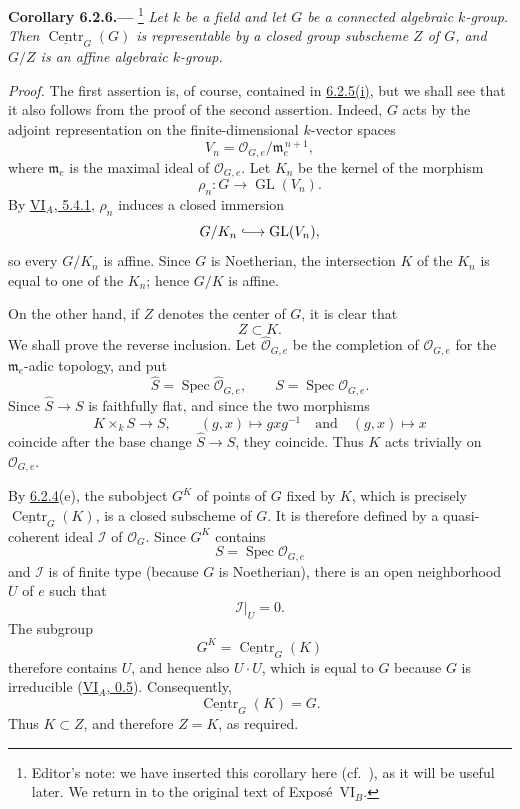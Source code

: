 
\medskip
{}\label{cor:sga3-VIB-6.2.6}%
\noindent\textbf{Corollary 6.2.6.---}%
\footnote{\label{note:sga3-VIB-59}Editor's note: we have inserted
this corollary here (cf.\ ), as it will be useful
later. We return in  to the original text of
Expos\'e~VI\(_B\).}
\emph{Let \(k\) be a field and let \(G\) be a connected
algebraic \(k\)-group. Then
\(\underline{\operatorname{Centr}}_G(G)\) is representable by a
closed group subscheme \(Z\) of \(G\), and \(G/Z\) is an affine
algebraic \(k\)-group.}

\emph{Proof.}
The first assertion is, of course, contained in
\hyperref[cor:sga3-VIB-6.2.5]{6.2.5\textup{(i)}}, but we shall
see that it also follows from the proof of the second assertion.
Indeed, \(G\) acts by the adjoint representation on the
finite-dimensional \(k\)-vector spaces
\[
  V_n=\mathcal O_{G,e}/\mathfrak m_e^{\,n+1},
\]
where \(\mathfrak m_e\) is the maximal ideal of
\(\mathcal O_{G,e}\). Let \(K_n\) be the kernel of the morphism
\[
  \rho_n:G\longrightarrow\operatorname{GL}(V_n).
\]
By \hyperref[prop:sga3-VIA-5.4.1]{VI\(_A\), 5.4.1},
\(\rho_n\) induces a closed immersion
\[
  G/K_n\lhook\joinrel\longrightarrow\operatorname{GL}(V_n),
\]
so every \(G/K_n\) is affine. Since \(G\) is Noetherian, the
intersection \(K\) of the \(K_n\) is equal to one of the \(K_n\);
hence \(G/K\) is affine.

On the other hand, if \(Z\) denotes the center of \(G\), it is
clear that
\[
  Z\subset K.
\]
We shall prove the reverse inclusion. Let
\(\widehat{\mathcal O}_{G,e}\) be the completion of
\(\mathcal O_{G,e}\) for the \(\mathfrak m_e\)-adic topology,
and put
\[
  \widehat S=\operatorname{Spec}\widehat{\mathcal O}_{G,e},
  \qquad
  S=\operatorname{Spec}\mathcal O_{G,e}.
\]
Since \(\widehat S\to S\) is faithfully flat, and since the two
morphisms
\[
  K\times_k S\longrightarrow S,
  \qquad
  (g,x)\longmapsto gxg^{-1}
  \quad\text{and}\quad
  (g,x)\longmapsto x
\]
coincide after the base change \(\widehat S\to S\), they
coincide. Thus \(K\) acts trivially on \(\mathcal O_{G,e}\).

By \hyperref[ex:sga3-VIB-6.2.4-e]{6.2.4}\textup{(e)}, the subobject \(G^K\) of points of \(G\)
fixed by \(K\), which is precisely
\(\underline{\operatorname{Centr}}_G(K)\), is a closed
subscheme of \(G\). It is therefore defined by a quasi-coherent
ideal \(\mathcal I\) of \(\mathcal O_G\). Since \(G^K\) contains
\[
  S=\operatorname{Spec}\mathcal O_{G,e}
\]
and \(\mathcal I\) is of finite type (because \(G\) is
Noetherian), there is an open neighborhood \(U\) of \(e\) such
that
\[
  \mathcal I|_U=0.
\]
The subgroup
\[
  G^K=\underline{\operatorname{Centr}}_G(K)
\]
therefore contains \(U\), and hence also \(U\cdot U\), which is
equal to \(G\) because \(G\) is irreducible
(\hyperref[sga3:VIA:0.5]{VI\(_A\), 0.5}). Consequently,
\[
  \underline{\operatorname{Centr}}_G(K)=G.
\]
Thus \(K\subset Z\), and therefore \(Z=K\), as required.
